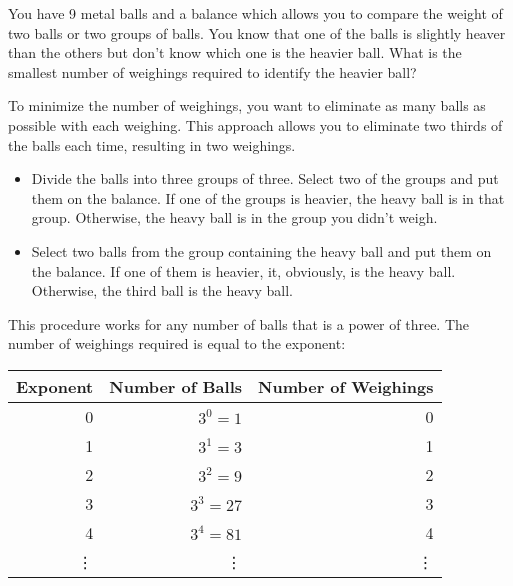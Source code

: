 \documentclass[letterpaper]{exam}
\begin{document}
    \begin{questions}

      \question
        You have 9 metal balls and a balance which allows you to compare the weight of two balls or
        two groups of balls.  You know that one of the balls is slightly heaver than the others but
        don't know which one is the heavier ball.  What is the smallest number of weighings required
        to identify the heavier ball?

        \begin{solution}
          To minimize the number of weighings, you want to eliminate as many balls as possible with each
          weighing.  This approach allows you to eliminate two thirds of the balls each time, resulting
          in two weighings.

          \begin{itemize}
            \item 
              Divide the balls into three groups of three.  Select two of the groups and put them on
              the balance.  If one of the groups is heavier, the heavy ball is in that group.
              Otherwise, the heavy ball is in the group you didn't weigh.

            \item 
              Select two balls from the group containing the heavy ball and put them on the balance.
              If one of them is heavier, it, obviously, is the heavy ball.  Otherwise, the third ball
              is the heavy ball. 

          \end{itemize}

          This procedure works for any number of balls that is a power of three. The number of
          weighings required is equal to the exponent:

          \begin{tabular}{rrr}
            \toprule
            Exponent & Number of Balls & Number of Weighings \\
            \midrule
            0        & $3^0 = 1$       & 0 \\
            1        & $3^1 = 3$       & 1 \\
            2        & $3^2 = 9$       & 2 \\
            3        & $3^3 = 27$      & 3 \\
            4        & $3^4 = 81$      & 4 \\
            \vdots   & \vdots          & \vdots \\
            \bottomrule
          \end{tabular}


\end{solution}
\end{questions}
\end{document}
